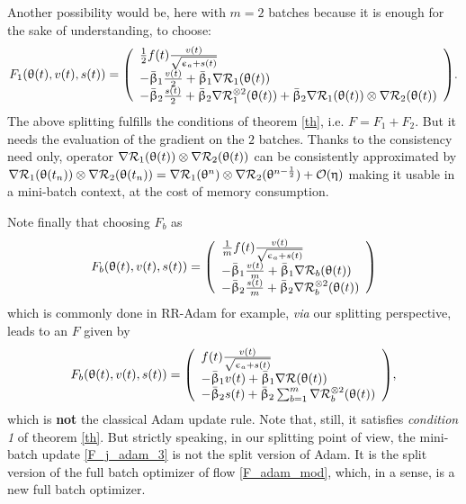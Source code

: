 \documentclass[article,authoryear,jmlmc]{beg_32}             %
\begin{document}
Another possibility would be, here with $m=2$ batches because it is enough for the sake of understanding, to choose: 
\begin{eqnarray}
\label{F_j_adam_2}
F_1(\theta(t),v(t),s(t))=\left(\begin{array}{l}
  \frac{1}{2}f(t) \frac{v(t)}{\sqrt{\epsilon_a+s(t)}}\\
     -\bar{\beta}_1 \frac{v(t)}{2}+\bar{\beta}_1\nR_1(\theta(t))\\
     -\bar{\beta}_2 \frac{s(t)}{2}+\bar{\beta}_2\nR_1^{\otimes 2}(\theta(t))+\bar{\beta}_2\nR_1(\theta(t))\otimes\nR_2(\theta(t)) \\
  \end{array}\right).
\end{eqnarray}
The above splitting fulfills the conditions of theorem \ref{th}, i.e. $F=F_1+F_2$. But it needs the evaluation of the gradient on the $2$ batches. Thanks to the consistency need only, operator 
$
\nabla \mathcal{R}_1(\uptheta(t))\otimes\nabla \mathcal{R}_2(\uptheta(t))
$
can be consistently approximated by  
$
\nabla \mathcal{R}_1(\uptheta(t_n))\otimes\nabla \mathcal{R}_2(\uptheta(t_n)) = \nabla \mathcal{R}_1(\uptheta^n)\otimes\nabla \mathcal{R}_2(\uptheta^{n-\frac12}) + \mathcal{O}(\upeta)
$
making it usable in a mini-batch context, at the cost of memory consumption. 

Note finally that choosing $F_b$ as
\begin{eqnarray}
\label{F_j_adam_3}
F_b(\theta(t),v(t),s(t))=\left(\begin{array}{l}
  \frac{1}{m}f(t) \frac{v(t)}{\sqrt{\epsilon_a+s(t)}}\\
     -\bar{\beta}_1 \frac{v(t)}{m}+\bar{\beta}_1\nR_b(\theta(t))\\
     -\bar{\beta}_2 \frac{s(t)}{m}+\bar{\beta}_2\nR_b^{\otimes 2}(\theta(t))\\
  \end{array}\right)
\end{eqnarray}
which is commonly done in RR-Adam for example, {\em via} our splitting perspective, 
leads to an $F$ given by 
\begin{eqnarray}
\label{F_adam_mod}
F_b(\theta(t),v(t),s(t))=\left(\begin{array}{l}
  f(t) \frac{v(t)}{\sqrt{\epsilon_a+s(t)}}\\
     -\bar{\beta}_1 {v(t)}+\bar{\beta}_1\nR(\theta(t))\\
     -\bar{\beta}_2 {s(t)}+\bar{\beta}_2\sum_{b=1}^m \nR_b^{\otimes 2}(\theta(t))\\
  \end{array}\right),
\end{eqnarray}
which is {\bf not} the classical Adam update rule. Note that, still, it satisfies
{\em condition 1} of theorem \ref{th}. But strictly speaking, in our splitting point of view, the mini-batch update \ref{F_j_adam_3} is not the split version of Adam. It is the split version of the full batch optimizer of flow \eqref{F_adam_mod}, which, in a sense, is a new full batch optimizer.  
\ \\
\end{document}
